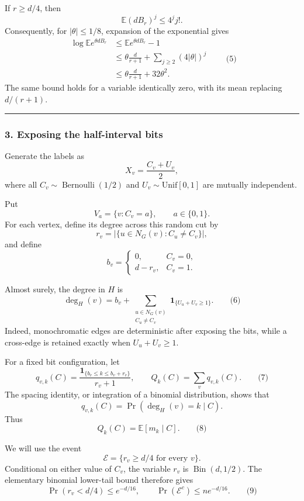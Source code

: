 \documentclass[
  11pt,
  a4paper,
]{article}
\begin{document}
If \(r\ge d/4\), then \[
\mathbb E(dB_r)^j\le 4^j j!.
\] Consequently, for \(|\theta|\le1/8\), expansion of the exponential
gives \begin{equation*}
\begin{aligned}
\log\mathbb E e^{\theta dB_r}
&\le
\mathbb E e^{\theta dB_r}-1\\
&\le
\theta\frac{d}{r+1}
+\sum_{j\ge2}(4|\theta|)^j\\
&\le
\theta\frac{d}{r+1}+32\theta^2.
\end{aligned}
\qquad\text{(5)}
\end{equation*} The same bound holds for a variable identically zero,
with its mean replacing \(d/(r+1)\).

\begin{center}\rule{0.5\linewidth}{0.5pt}\end{center}

\subsubsection{3. Exposing the half-interval
bits}\label{exposing-the-half-interval-bits}

Generate the labels as \[
X_v=\frac{C_v+U_v}{2},
\] where all \(C_v\sim\operatorname{Bernoulli}(1/2)\) and
\(U_v\sim\mathrm{Unif}[0,1]\) are mutually independent.

Put \[
V_a=\{v:C_v=a\},\qquad a\in\{0,1\}.
\] For each vertex, define its degree across this random cut by \[
r_v=\bigl|\{u\in N_G(v):C_u\ne C_v\}\bigr|,
\] and define \[
b_v=
\begin{cases}
0,&C_v=0,\\
d-r_v,&C_v=1.
\end{cases}
\]

Almost surely, the degree in \(H\) is \[
\deg_H(v)
=
b_v+
\sum_{\substack{u\in N_G(v)\\ C_u\ne C_v}}
\mathbf 1_{\{U_u+U_v\ge1\}}.
\qquad\text{(6)}
\] Indeed, monochromatic edges are deterministic after exposing the
bits, while a cross-edge is retained exactly when \(U_u+U_v\ge1\).

For a fixed bit configuration, let \[
q_{v,k}(C)
=
\frac{\mathbf 1_{\{b_v\le k\le b_v+r_v\}}}{r_v+1},
\qquad
Q_k(C)=\sum_v q_{v,k}(C).
\qquad\text{(7)}
\] The spacing identity, or integration of a binomial distribution,
shows that \[
q_{v,k}(C)=\Pr(\deg_H(v)=k\mid C).
\] Thus \[
Q_k(C)=\mathbb E[m_k\mid C].
\qquad\text{(8)}
\]

We will use the event \[
\mathcal E=\{r_v\ge d/4\text{ for every }v\}.
\] Conditional on either value of \(C_v\), the variable \(r_v\) is
\(\operatorname{Bin}(d,1/2)\). The elementary binomial lower-tail bound
therefore gives \[
\Pr(r_v<d/4)\le e^{-d/16},
\qquad
\Pr(\mathcal E^c)\le ne^{-d/16}.
\qquad\text{(9)}
\]
\end{document}
